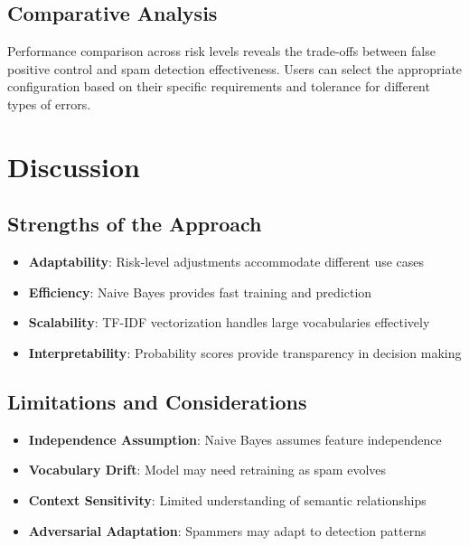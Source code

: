 \documentclass[12pt,a4paper]{article}
\begin{document}
\subsection{Comparative Analysis}

Performance comparison across risk levels reveals the trade-offs between false positive control and spam detection effectiveness. Users can select the appropriate configuration based on their specific requirements and tolerance for different types of errors.


\section{Discussion}

\subsection{Strengths of the Approach}

\begin{itemize}
    \item \textbf{Adaptability}: Risk-level adjustments accommodate different use cases
    \item \textbf{Efficiency}: Naive Bayes provides fast training and prediction
    \item \textbf{Scalability}: TF-IDF vectorization handles large vocabularies effectively
    \item \textbf{Interpretability}: Probability scores provide transparency in decision making
\end{itemize}

\subsection{Limitations and Considerations}

\begin{itemize}
    \item \textbf{Independence Assumption}: Naive Bayes assumes feature independence
    \item \textbf{Vocabulary Drift}: Model may need retraining as spam evolves
    \item \textbf{Context Sensitivity}: Limited understanding of semantic relationships
    \item \textbf{Adversarial Adaptation}: Spammers may adapt to detection patterns
\end{itemize}
\end{document}
